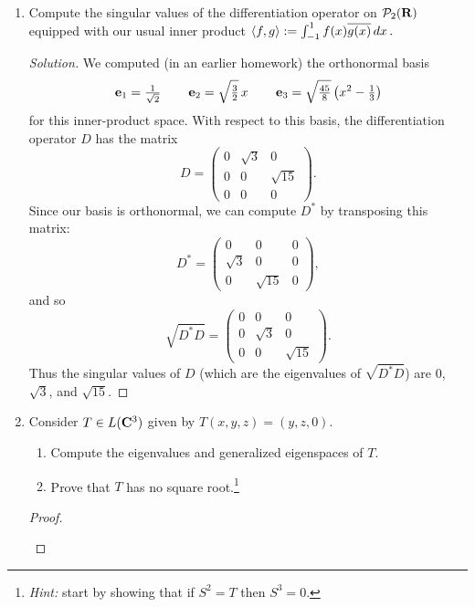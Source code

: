 \documentclass[11pt]{amsart}
\begin{document}
\begin{enumerate}[(1)]

\vspace{12pt}

\item Compute the singular values of the differentiation operator on $\mathcal{P}_2(\mathbf{R})$ equipped with our usual inner product $\left< f, g \right> := \int_{ -1 }^1 f(x) \overline{g(x)} \, dx \, .$

\begin{proof}[Solution]
We computed (in an earlier homework) the orthonormal basis
\[
  \mathbf e_1 = \tfrac{ 1 }{ \sqrt 2 } \, \qquad
  \mathbf e_2 = \sqrt{ \tfrac 3 2 } \, x \, \qquad
  \mathbf e_3 = \sqrt{ \tfrac{ 45 }{ 8 }  }  \left( x^2 - \tfrac{ 1 }{ 3 } \right)
\]
for this inner-product space. With respect to this basis, the differentiation operator $D$ has the matrix
\[
  D = \left( \begin{array}{ccc}
  0 & \sqrt 3 & 0 \\
  0 & 0 & \sqrt{15} \\
  0 & 0 & 0
  \end{array} \right) .
\]
Since our basis is orthonormal, we can compute $D^*$ by transposing this matrix:
\[
  D^*  = \left( \begin{array}{ccc}
  0 & 0 & 0 \\
  \sqrt 3 & 0 & 0 \\
  0 & \sqrt{15} & 0
  \end{array} \right) ,
\]
and so
\[
  \sqrt{ D^* D } = \left( \begin{array}{ccc}
  0 & 0 & 0 \\
  0 & \sqrt 3 & 0 \\
  0 & 0 & \sqrt{15}
  \end{array} \right) .
\]
Thus the singular values of $D$ (which are the eigenvalues of $\sqrt{ D^* D }$) are 0, $\sqrt 3$, and $\sqrt{15}$.
\end{proof}

\item Consider $T \in L(\mathbf{C}^3)$ given by $T(x,y,z) = (y,z,0)$.
  \begin{enumerate}
  \item Compute the eigenvalues and generalized eigenspaces of $T$.
  \item Prove that $T$ has no square root.\footnote{\emph{Hint:} start by showing that if $S^2 = T$ then $S^3 = 0$.}
  \end{enumerate}

\begin{proof}
\begin{enumerate}


\end{enumerate}
\end{proof}
\end{enumerate}
\end{document}
